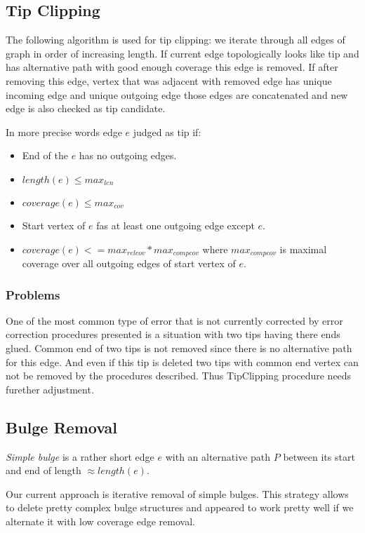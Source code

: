 \documentclass[12pt]{article}
\begin{document}
\subsection{Tip Clipping}

The following algorithm is used for tip clipping: we iterate through all edges of graph in order of increasing length. If current edge topologically looks like tip and has alternative path with good enough coverage this edge is removed. If after removing this edge, vertex that was adjacent with removed edge has unique incoming edge and unique outgoing edge those edges are concatenated and new edge is also checked as tip candidate.

In more precise words edge $e$ judged as tip if:
\begin{itemize}
\item End of the $e$ has no outgoing edges.
\item $length(e) \le max_{len}$
\item $coverage(e) \le max_{cov}$
\item Start vertex of $e$ fas at least one outgoing edge except $e$.
\item $coverage(e) <= max_{relcov} * max_{compcov}$ where $max_{compcov}$ is maximal coverage over all outgoing edges of start vertex of $e$.
\end{itemize}

\subsubsection{Problems}
One of the most common type of error that is not currently corrected by error correction procedures presented is a situation with two tips having there ends glued. Common end of two tips is not removed since there is no alternative path for this edge. And even if this tip is deleted two tips with common end vertex can not be removed by the procedures described. Thus TipClipping procedure needs furether adjustment.

\subsection{Bulge Removal}
\textit{Simple bulge} is a rather short edge $e$ with an alternative path $P$ between its start and end of length $\approx length(e)$.

Our current approach is iterative removal of simple bulges. This strategy allows to delete pretty complex bulge structures and appeared to work pretty well if we alternate it with low coverage edge removal.
\end{document}
